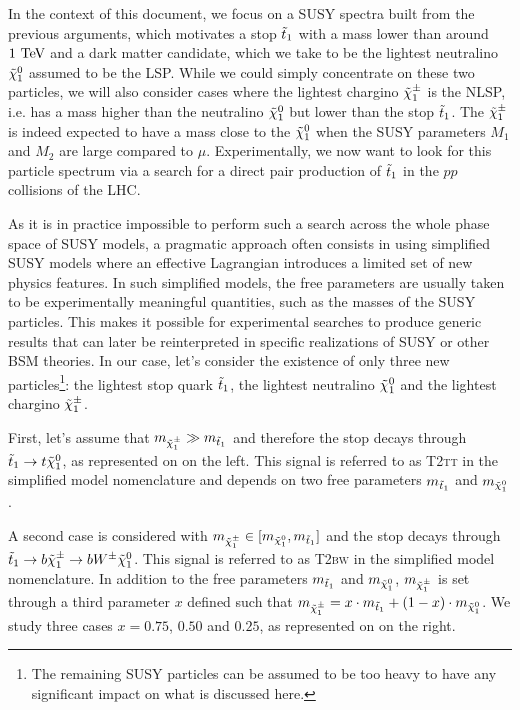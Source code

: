     In the context of this document, we focus on a SUSY spectra built from the
    previous arguments, which motivates a stop $\tilde{t}_1$ with a mass lower than around
    $1~\text{TeV}$ and a dark matter candidate, which we take to be the lightest neutralino
    $\tilde{\chi}_1^0$ assumed to be the LSP. While we could simply concentrate on these
    two particles, we will also consider cases where the lightest chargino $\tilde{\chi}_1^\pm$
    is the NLSP, i.e. has a mass higher than the neutralino $\tilde{\chi}_1^0$ but lower
    than the stop $\tilde{t}_1$. The $\tilde{\chi}_1^\pm$ is indeed expected to have a mass close
    to the $\tilde{\chi}_1^0$ when the SUSY parameters $M_1$ and $M_2$
    are large compared to $\mu$. Experimentally, we now want to look for this particle
    spectrum via a search for a direct pair production of $\tilde{t}_1$ in the $pp$ collisions of the LHC.

    As it is in practice impossible to perform such a search across the whole phase
    space of SUSY models, a pragmatic approach often consists in using simplified SUSY
    models where an
    effective Lagrangian introduces a limited set of new physics features. In such
    simplified models, the free parameters are usually taken to be experimentally
    meaningful quantities, such as the masses of the SUSY particles. This makes
    it possible for experimental searches to produce generic results that can later
    be reinterpreted in specific realizations of SUSY \cite{LiemSMS, SmodelS}
    or other BSM theories. In our case, let's consider the existence of only three new
    particles\footnote{The remaining SUSY particles can be assumed to be too heavy to
    have any significant impact on what is discussed here.}: the lightest stop quark
    $\tilde{t}_1$, the lightest neutralino $\tilde{\chi}_1^0$ and the lightest chargino $
    \tilde{\chi}_1^\pm$.

    First, let's assume that $m_{\tilde{\chi}_1^\pm} \gg m_{\tilde{t}_1}$ and therefore the
    stop decays through $\tilde{t}_1 \rightarrow t \tilde{\chi}_1^0$, as represented on
     on the left. This signal is referred to as \textsc{T2tt}
    in the simplified model nomenclature and depends on two free parameters
    $m_{\tilde{t}_1}$ and $m_{\tilde{\chi}_1^0}$.

    A second case is considered with $m_{\tilde{\chi}_1^\pm} \in [m_{\tilde{\chi}_1^0},
    m_{\tilde{t}_1}]$ and the stop decays through $\tilde{t}_1 \rightarrow b \tilde{\chi}_1^\pm
    \rightarrow b W^{\pm} \tilde{\chi}_1^0$. This signal is referred to as \textsc{T2bw}
    in the simplified model nomenclature. In addition to the free  parameters
    $m_{\tilde{t}_1}$ and $m_{\tilde{\chi}_1^0}$, $m_{\tilde{\chi}_1^\pm}$ is set through a
    third parameter $x$ defined such that $m_{\tilde{\chi}_1^\pm} = x \cdot m_{\tilde{t}_1}
    + (1 - x) \cdot m_{\tilde{\chi}_1^0}$. We study three cases $x = 0.75$, $0.50$
    and $0.25$, as represented on  on the right.

